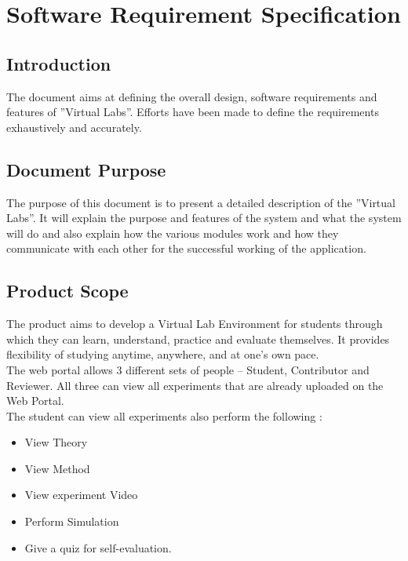 \documentclass[12pt]{report}
\begin{document}
\pagebreak
\cleardoublepage

\setcounter{page}{1}

\chapter{Software Requirement Specification}

\section{Introduction}
The document aims at defining the overall design, software requirements and features of ''Virtual Labs''. Efforts have been made to define the requirements exhaustively and accurately. 

\section{Document Purpose}
The purpose of this document is to present a detailed description of the ''Virtual Labs''. It will explain the purpose and features of the system and what the system will do and also explain how the various modules work and how they communicate with each other for the successful working of the application.

\section{Product Scope}
The product aims to develop a Virtual Lab Environment for students through which they can learn, understand, practice and evaluate themselves. It provides flexibility of studying anytime, anywhere, and at one's own pace.
\\

The web portal allows 3 different sets of people – Student, Contributor and Reviewer. All three can view all experiments that are already uploaded on the Web Portal. \\
The student can view all experiments also perform the following :
\begin{itemize}
\item View Theory
\item View Method
\item View experiment Video
\item Perform Simulation
\item Give a quiz for self-evaluation.
\end{itemize}
\end{document}
